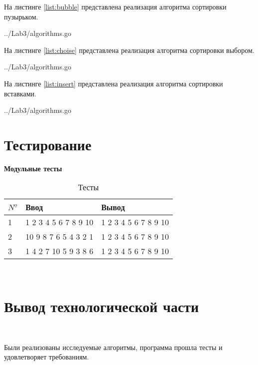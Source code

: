 На листинге \ref{list:bubble} представлена реализация алгоритма сортировки пузырьком.

\begin{lstinputlisting}
    [caption = {Реализация алгоритма сортировки пузырьком},
    label = {list:bubble},
    linerange={5-13},
    ]{../Lab3/algorithms.go}
\end{lstinputlisting}

На листинге \ref{list:choise} представлена реализация алгоритма сортировки выбором.

\begin{lstinputlisting}
    [caption = {Реализация алгоритма сортировки выбором},
    label = {list:choise},
    linerange={24-38},
    ]{../Lab3/algorithms.go}
\end{lstinputlisting}

На листинге \ref{list:insert} представлена реализация алгоритма сортировки вставками.

\begin{lstinputlisting}
    [caption = {Реализация алгоритма сортировки вставками},
    label = {list:insert},
    linerange={16-22},
    ]{../Lab3/algorithms.go}
\end{lstinputlisting}

\section{Тестирование}\label{TestResult}


\textbf{Модульные тесты}


\begin{table}[ht]
    \caption{Тесты}
\begin{tabular}{ l || l || l }
    ${N^{\underline{o}}}$ & Ввод & Вывод   \\ \hline
    1 &
    1 2 3 4 5 6 7 8 9 10
    &
    1 2 3 4 5 6 7 8 9 10
    \\  \hline \hline

    2 &
    10 9 8 7 6 5 4 3 2 1 
    &
    1 2 3 4 5 6 7 8 9 10
    \\  \hline \hline


    3 &
    1 4 2 7 10 5 9 3 8 6
    &
    1 2 3 4 5 6 7 8 9 10
    \\  \hline \hline

\end{tabular}
\label{tab:matrixMultiply}
\end{table}


~\section{Вывод технологической части}\label{TechResults}~

Были реализованы исследуемые алгоритмы, программа прошла тесты и удовлетворяет требованиям.

